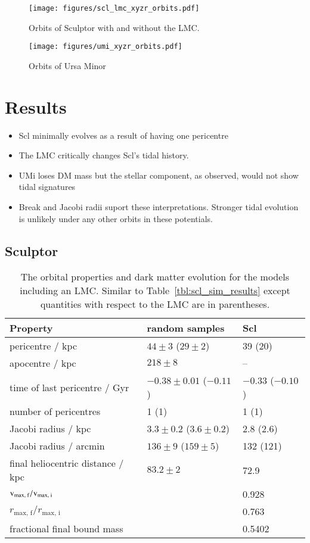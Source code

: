 \documentclass{aa}
\newcommand{\V}{{\rm v}}
\begin{document}
\begin{figure}
    \centering
    \texttt{[image: figures/scl\_lmc\_xyzr\_orbits.pdf]}
    \caption{
        Orbits of Sculptor with and without the LMC.
    }
    \label{fig:scl_orbits}
\end{figure}


\begin{figure}
    \centering
    \texttt{[image: figures/umi\_xyzr\_orbits.pdf]}
    \caption{
        Orbits of Ursa Minor
    }
    \label{fig:umi_orbits}
\end{figure}


\section{Results}

\begin{itemize}
    \item Scl minimally evolves as a result of having one pericentre
    \item The LMC critically changes Scl's tidal history.
    \item UMi loses DM mass but the stellar component, as observed, would not show tidal signatures
    \item Break and Jacobi radii suport these interpretations. Stronger tidal evolution is unlikely under any other orbits in these potentials.
\end{itemize}

\subsection{Sculptor}
\begin{table}[t]
\centering
\caption[Orbits and results for Sculptor in the MW+LMC potential.]{The orbital properties and dark matter evolution for the models including an LMC. Similar to Table \ref{tbl:scl_sim_results} except quantities with respect to the LMC are in parentheses. }
\label{tbl:scl_lmc_sims}
\begin{tabular}{lll}
\hline
Property & random samples & Scl\\
\hline
pericentre $/$ kpc & $44\pm 3$ ($29 \pm 2$) & 39 (20)\\
apocentre $/$ kpc & $218 \pm 8$ & –\\
time of last pericentre $/$ Gyr & $-0.38\pm0.01$ ($-0.11$) & $-0.33$ ($-0.10$)\\
number of pericentres & 1 (1) & 1 (1)\\
Jacobi radius $/$ kpc & $3.3\pm0.2$ ($3.6\pm0.2$) & 2.8 (2.6)\\
Jacobi radius $/$ arcmin & $136 \pm 9$ ($159\pm5$) & 132 (121)\\
final heliocentric distance $/$ kpc & $83.2\pm2$ & 72.9\\
$\V_\textrm{max, f} / \V_\textrm{max, i}$ &  & 0.928\\
$r_\textrm{max, f} / r_\textrm{max, i}$ &  & 0.763\\
fractional final bound mass &  & 0.5402\\
\hline
\end{tabular}
\end{table}
\end{document}
